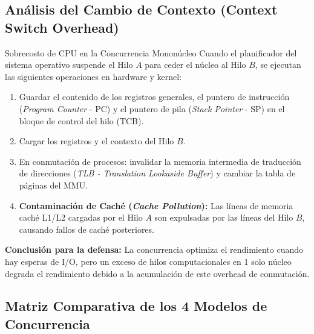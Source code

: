 \documentclass[11pt,a4paper]{article}
\begin{document}
\subsection{Análisis del Cambio de Contexto (Context Switch Overhead)}
\begin{conceptbox}{Sobrecosto de CPU en la Concurrencia Mononúcleo}
Cuando el planificador del sistema operativo suspende el Hilo $A$ para ceder el núcleo al Hilo $B$, se ejecutan las siguientes operaciones en hardware y kernel:
\begin{enumerate}[leftmargin=5mm]
    \item Guardar el contenido de los registros generales, el puntero de instrucción (\textit{Program Counter} - PC) y el puntero de pila (\textit{Stack Pointer} - SP) en el bloque de control del hilo (TCB).
    \item Cargar los registros y el contexto del Hilo $B$.
    \item En conmutación de procesos: invalidar la memoria intermedia de traducción de direcciones (\textit{TLB - Translation Lookaside Buffer}) y cambiar la tabla de páginas del MMU.
    \item \textbf{Contaminación de Caché (\textit{Cache Pollution}):} Las líneas de memoria caché L1/L2 cargadas por el Hilo $A$ son expulsadas por las líneas del Hilo $B$, causando fallos de caché posteriores.
\end{enumerate}
\textbf{Conclusión para la defensa:} La concurrencia optimiza el rendimiento cuando hay esperas de I/O, pero un exceso de hilos computacionales en 1 solo núcleo degrada el rendimiento debido a la acumulación de este overhead de conmutación.
\end{conceptbox}

\subsection{Matriz Comparativa de los 4 Modelos de Concurrencia}
\end{document}
